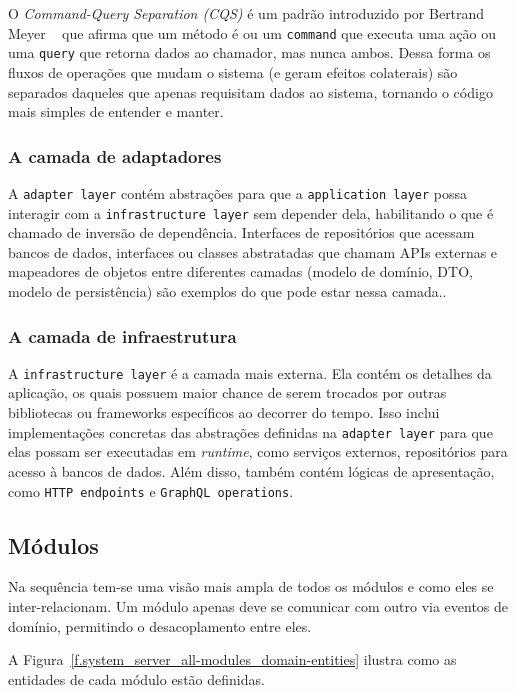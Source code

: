 O \emph{Command-Query Separation (CQS)} é um padrão introduzido por Bertrand Meyer ~\cite{object-oriented-software-construction} que afirma que um método é ou um \texttt{command} que executa uma ação ou uma \texttt{query} que retorna dados ao chamador, mas nunca ambos. Dessa forma os fluxos de operações que mudam o sistema (e geram efeitos colaterais) são separados daqueles que apenas requisitam dados ao sistema, tornando o código mais simples de entender e manter.

\subsubsection{A camada de adaptadores}

A \texttt{adapter layer} contém abstrações para que a \texttt{application layer} possa interagir com a \texttt{infrastructure layer} sem depender dela, habilitando o que é chamado de inversão de dependência. Interfaces de repositórios que acessam bancos de dados, interfaces ou classes abstratadas que chamam APIs externas e mapeadores de objetos entre diferentes camadas (modelo de domínio, DTO, modelo de persistência) são exemplos do que pode estar nessa camada..

\subsubsection{A camada de infraestrutura}

A \texttt{infrastructure layer} é a camada mais externa. Ela contém os detalhes da aplicação, os quais possuem maior chance de serem trocados por outras bibliotecas ou frameworks específicos ao decorrer do tempo. Isso inclui implementações concretas das abstrações definidas na \texttt{adapter layer} para que elas possam ser executadas em \emph{runtime}, como serviços externos, repositórios para acesso à bancos de dados. Além disso, também contém lógicas de apresentação, como \texttt{HTTP endpoints} e \texttt{GraphQL operations}.

\subsection{Módulos}

Na sequência tem-se uma visão mais ampla de todos os módulos e como eles se inter-relacionam. Um módulo apenas deve se comunicar com outro via eventos de domínio, permitindo o desacoplamento entre eles.

A Figura~\ref{f.system_server_all-modules_domain-entities} ilustra como as entidades de cada módulo estão definidas. 

